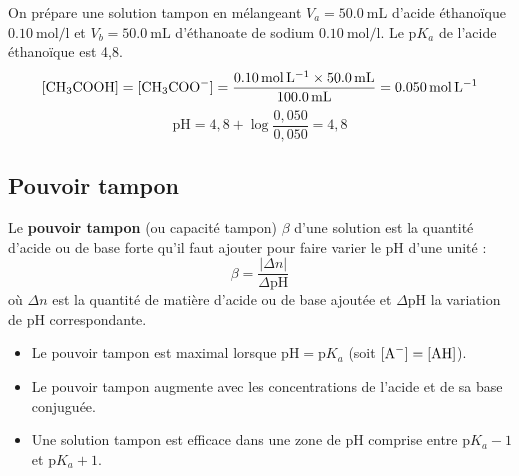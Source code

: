 \begin{exemple}
On prépare une solution tampon en mélangeant $V_a = \SI{50,0}{\mL}$ d'acide éthanoïque $\SI{0,10}{\mol\per\litre}$ et $V_b = \SI{50,0}{\mL}$ d'éthanoate de sodium $\SI{0,10}{\mol\per\litre}$. Le $\mathrm{p}K_a$ de l'acide éthanoïque est 4,8.
\[[\ce{CH3COOH}] = [\ce{CH3COO-}] = \frac{\SI{0,10}{\mol\per\litre} \times \SI{50,0}{\mL}}{\SI{100,0}{\mL}} = \SI{0,050}{\mol\per\litre}\]
\[\mathrm{pH} = 4,8 + \log\frac{0,050}{0,050} = 4,8\]
\end{exemple}

\subsection{Pouvoir tampon}

\begin{definition}
Le \textbf{pouvoir tampon} (ou capacité tampon) $\beta$ d'une solution est la quantité d'acide ou de base forte qu'il faut ajouter pour faire varier le pH d'une unité :
\[\beta = \frac{|\Delta n|}{\Delta\mathrm{pH}}\]
où $\Delta n$ est la quantité de matière d'acide ou de base ajoutée et $\Delta\mathrm{pH}$ la variation de pH correspondante.
\end{definition}

\begin{propriete}
\begin{itemize}
    \item Le pouvoir tampon est maximal lorsque $\mathrm{pH} = \mathrm{p}K_a$ (soit $[\ce{A-}] = [\ce{AH}]$).
    \item Le pouvoir tampon augmente avec les concentrations de l'acide et de sa base conjuguée.
    \item Une solution tampon est efficace dans une zone de pH comprise entre $\mathrm{p}K_a - 1$ et $\mathrm{p}K_a + 1$.
\end{itemize}
\end{propriete}

